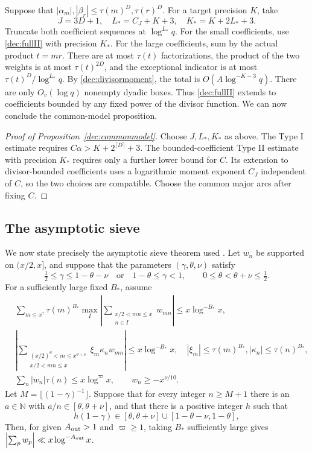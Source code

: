 \documentclass[11pt,a4paper]{article}
\theoremstyle{paperplain}
\numberwithin{equation}{section}
\begin{document}
Suppose that $|\alpha_m|,|\beta_r|\le\tau(m)^D,\tau(r)^D$.
For a target precision $K$, take
\[
 J=3D+1,\quad L_*=C_J+K+3,\quad K_*=K+2L_*+3.
\]
Truncate both coefficient sequences at $\log^{L_*}q$.
For the small coefficients, use \eqref{dec:fullII} with precision $K_*$.
For the large coefficients, sum by the actual product $t=mr$.
There are at most $\tau(t)$ factorizations, the product of the two
weights is at most $\tau(t)^{2D}$, and the exceptional indicator is
at most $\tau(t)^D/\log^{L_*}q$.
By \eqref{dec:divisormoment}, the total is $O(A\log^{-K-3}q)$.
There are only $O_v(\log q)$ nonempty dyadic boxes.
Thus \eqref{dec:fullII} extends to coefficients bounded by any fixed
power of the divisor function. We can now conclude the common-model proposition.

\begin{proof}[Proof of Proposition~\ref{dec:commonmodel}]
Choose $J,L_*,K_*$ as above. The Type I estimate requires
$C\alpha>K+2^{\lceil D\rceil}+3$.
The bounded-coefficient Type II estimate with precision $K_*$
requires only a further lower bound for $C$.
Its extension to divisor-bounded coefficients uses a logarithmic
moment exponent $C_J$ independent of $C$, so the two choices are
compatible. Choose the common major arcs after fixing $C$.
\end{proof}

\subsection{The asymptotic sieve}
\label{dec:sieve}

We now state precisely the asymptotic sieve theorem used
\cite[Theorem 2.2(a)]{FordMaynard2024}.
Let $w_n$ be supported on $(x/2,x]$, and suppose that the parameters
$(\gamma,\theta,\nu)$ satisfy
\[
 \tfrac12\le\gamma\le1-\theta-\nu\quad\text{or}\quad
 1-\theta\le\gamma<1,\qquad
 0\le\theta<\theta+\nu\le\tfrac12.
\]
For a sufficiently large fixed $B_*$, assume
\begin{align}
 &\sum_{m\le x^\gamma}\tau(m)^{B_*}\max_I
 \left|\sum_{\substack{x/2<mn\le x\\n\in I}}w_{mn}\right|
 \le x\log^{-B_*}x,\label{dec:FM_I}\\
 &\left|\sum_{\substack{(x/2)^\theta<m\le x^{\theta+\nu}\\x/2<mn\le x}}
 \xi_m\kappa_nw_{mn}\right|\le x\log^{-B_*}x,\quad
 |\xi_m|\le\tau(m)^{B_*}, |\kappa_n|\le\tau(n)^{B_*},\label{dec:FM_II}\\
 &\sum_n|w_n|\tau(n)\le x\log^\varpi x,\qquad
 w_n\ge-x^{\nu/10}.\label{dec:FM_growth}
\end{align}
Let $M=\lfloor(1-\gamma)^{-1}\rfloor$.
Suppose that for every integer $n\ge M+1$ there is an
$a\in\mathbb N$ with $a/n\in[\theta,\theta+\nu]$, and that
there is a positive integer $h$ such that
\[
 h(1-\gamma)\in[\theta,\theta+\nu]\cup[1-\theta-\nu,1-\theta],
\]
Then, for given $A_{\rm out}>1$ and $\varpi\ge1$, taking $B_*$
sufficiently large gives $\left|\sum_pw_p\right|\ll x\log^{-A_{\rm out}}x$.
\end{document}
